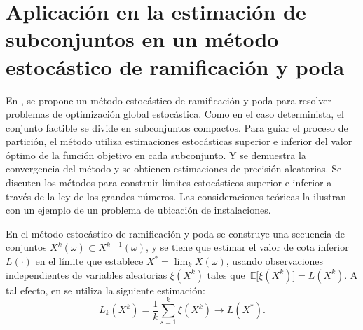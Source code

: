 \documentclass{article}
\newcommand\espe[1]{\, \mathbb{E} \lbrack #1 \rbrack}
\begin{document}
\section{Aplicación en la estimación de subconjuntos en un método estocástico de ramificación y poda } 
 En \cite{norkin1998branch}, se propone un método estocástico de ramificación y poda para resolver problemas de optimización global estocástica. Como en el caso determinista, el conjunto factible se divide en subconjuntos compactos. Para guiar el proceso de partición, el método utiliza estimaciones estocásticas superior e inferior del valor óptimo de la función objetivo en cada subconjunto. Y se demuestra la convergencia del método y se obtienen estimaciones de precisión aleatorias. Se discuten los métodos para construir límites estocásticos superior e inferior a través de la ley de los grandes números. Las consideraciones teóricas la ilustran con un ejemplo de un problema de ubicación de instalaciones.
 
En el método estocástico de ramificación y poda \cite{norkin1998branch} se construye una secuencia de conjuntos $X^{k}(\omega) \subset X^{k-1}(\omega)$, y se tiene que estimar el valor de cota inferior $L(\cdot)$ en el límite que establece $X^{\ast} =\lim_k X(\omega)$, usando observaciones independientes de variables aleatorias $\xi (X^k)$ tales que $\espe{\xi(X^k)}=L(X^{k})$. A tal efecto, en\cite{norkin1998branch} se utiliza la siguiente estimación:
\begin{equation}
    L_k(X^k)= \frac{1}{k}\sum_{s=1}^{k}\xi(X^k) \to L(X^{\ast}).
\end{equation}
\newpage


\end{document}

